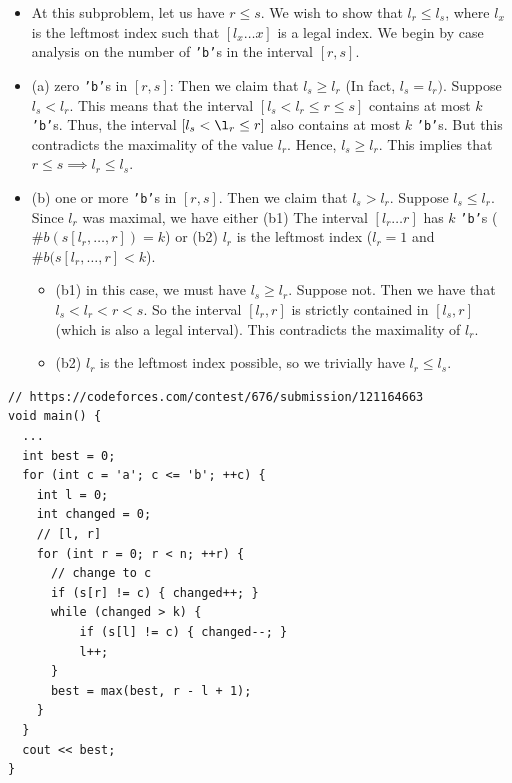 \begin{itemize}
    \item At this subproblem, let us have $r \leq s$. We wish to show that $l_r \leq l_s$, where $l_x$ 
        is the leftmost index such that $[l_x \dots x]$ is a legal index. We begin by case analysis on the number of \texttt{'b'}s
        in the interval $[r, s]$.
    \item (a) zero \texttt{'b'}s in $[r, s]$: Then we claim that $l_s \geq l_r$ (In fact, $l_s = l_r)$. Suppose $l_s < l_r$.
        This means that the interval $[l_s < l_r \leq r \leq s]$ contains at most $k$ \texttt{'b'}s. Thus, the interval $[l_s < \l_r \leq r]$
        also contains at most $k$ \texttt{'b'}s. But this contradicts the maximality of the value $l_r$. Hence, $l_s \geq l_r$.
        This implies that $r \leq s \implies l_r \leq l_s$.
    \item (b) one or more \texttt{'b'}s in $[r, s]$. Then we claim that $l_s > l_r$. Suppose $l_s \leq l_r$.
        Since $l_r$ was maximal, we have either (b1) The interval $[l_r \dots r]$ has $k$ \texttt{'b'}s ($\# b(s[l_r, \dots, r]) = k$)
        or (b2) $l_r$ is the leftmost index ($l_r = 1$ and $\# b(s[l_r, \dots, r] < k$).
        \begin{itemize}
            \item (b1) in this case, we must have $l_s \geq l_r$. Suppose not. Then we have that $l_s < l_r < r < s$. So the interval
                $[l_r, r]$ is strictly contained in $[l_s, r]$ (which is also a legal interval). This contradicts the maximality of $l_r$.
            \item (b2) $l_r$ is the leftmost index possible, so we trivially have $l_r \leq l_s$.
        \end{itemize}
\end{itemize}

\begin{verbatim}
// https://codeforces.com/contest/676/submission/121164663
void main() {
  ...
  int best = 0;
  for (int c = 'a'; c <= 'b'; ++c) {
    int l = 0;
    int changed = 0;
    // [l, r]
    for (int r = 0; r < n; ++r) {
      // change to c
      if (s[r] != c) { changed++; }
      while (changed > k) {
          if (s[l] != c) { changed--; }
          l++;
      }
      best = max(best, r - l + 1);
    }
  }
  cout << best;
}
\end{verbatim}


